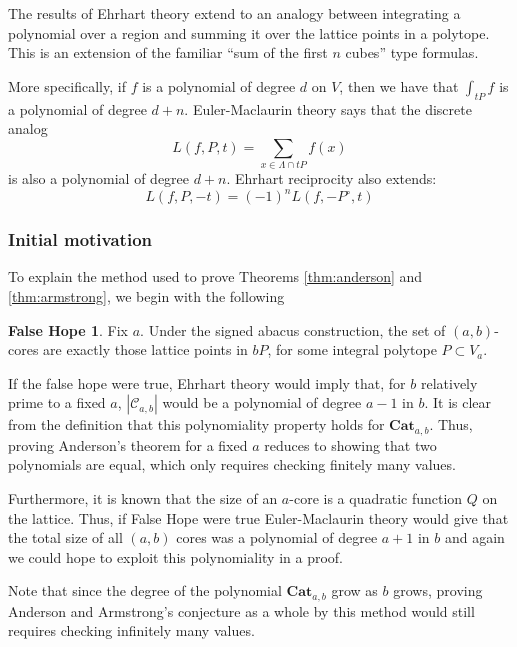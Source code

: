 \documentclass{amsart}[12pt]
\theoremstyle{definition}
\newtheorem{FalseHope}{False Hope}
\newcommand{\Cat}{\mathbf{Cat}}
\begin{document}
The results of Ehrhart theory extend to an analogy between integrating a polynomial over a region and summing it over the lattice points in a polytope.  This is an extension of the familiar ``sum of the first $n$ cubes'' type formulas.

More specifically, if $f$ is a polynomial of degree $d$ on $V$, then we have that $\int_{tP} f$ is a polynomial of degree $d+n$.  Euler-Maclaurin theory says that the discrete analog
 $$L(f, P, t)=\sum_{x\in\Lambda\cap tP} f(x)$$
is also a polynomial of degree $d+ n$. Ehrhart reciprocity also extends: $$L(f,P,-t)=(-1)^nL(f, -P^\circ, t)$$





\subsubsection{Initial motivation}
To explain the method used to prove Theorems \ref{thm:anderson} and \ref{thm:armstrong}, we begin with the following 

\begin{FalseHope}
Fix $a$.  Under the signed abacus construction, the set of $(a,b)$-cores are exactly those lattice points in $bP$, for some integral polytope $P\subset V_a$.
\end{FalseHope}

  If the false hope were true, Ehrhart theory would imply that, for $b$ relatively prime to a fixed $a$, $|\mathcal{C}_{a,b}|$ would be a polynomial of degree $a-1$ in $b$.  It is clear from the definition that this polynomiality property holds for $\Cat_{a,b}$.  Thus, proving Anderson's theorem for a fixed $a$  reduces to showing that two polynomials are equal, which only requires checking finitely many values.  

Furthermore, it is known that the size of an $a$-core is a quadratic function $Q$ on the lattice.  Thus, if False Hope were true Euler-Maclaurin theory would give that the total size of all $(a,b)$ cores was a polynomial of degree $a+1$ in $b$ and again we could hope to exploit this polynomiality in a proof.

Note that since the degree of the polynomial $\Cat_{a,b}$ grow as $b$ grows, proving Anderson and Armstrong's conjecture as a whole by this method would still requires checking infinitely many values.


\subsubsection{}
\end{document}

